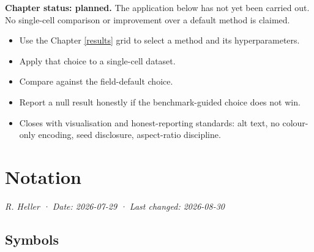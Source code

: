 \documentclass[
  british,
  a4paper,
]{book}
\providecommand{\tightlist}{%
  \setlength{\itemsep}{0pt}\setlength{\parskip}{0pt}}
\begin{document}
\textbf{Chapter status: planned.} The application below has not yet been carried out. No single-cell comparison or improvement over a default method is claimed.

\begin{itemize}
\tightlist
\item
  Use the Chapter \ref{results} grid to select a method and its hyperparameters.
\item
  Apply that choice to a single-cell dataset.
\item
  Compare against the field-default choice.
\item
  Report a null result honestly if the benchmark-guided choice does not win.
\item
  Closes with visualisation and honest-reporting standards: alt text, no colour-only encoding, seed disclosure, aspect-ratio discipline.
\end{itemize}

\appendix


\chapter{Notation}\label{notation}

\emph{R. Heller · Date: 2026-07-29 · Last changed: 2026-08-30}

\section*{Symbols}\label{notation-symbols}
\end{document}
